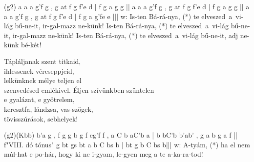 \documentclass[twoside]{article}
\begin{document}

\begin{aretino}
(g2) a a a g'f g , g at f g f'e d | f g a g g || a a a g'f g , g at f g f'e d | f g a g g || a a a g'f g , g at f g f'e d | f g a g'fe e |||
w: Is-ten Bá-rá-nya, (*) te elveszed~a~vi-lág bű-ne-it, ir-gal-mazz ne-künk! Is-ten Bá-rá-nya, (*) te elveszed~a~vi-lág bű-ne-it, ir-gal-mazz ne-künk! Is-ten Bá-rá-nya, (*) te elveszed~a~vi-lág bű-ne-it, adj ne-künk bé-két!
\end{aretino}



\begin{hymnstanzas}
  Tápláljanak szent titkaid,\\
  ihlessenek vércseppjeid,\\
  lelkünknek mélye teljen el\\
  szenvedésed emlékivel.
\stanzabreak
  Éljen szívünkben szüntelen\\
  e gyalázat, e gyötrelem,\\
  keresztfa, lándzsa, vas-szögek,\\
  tövisszúrások, sebhelyek!
\end{hymnstanzas}


\begin{aretino}
(g2)(Kbb) b'a g , f g g b g f eg'f f , a C b aC'b a | b bC'b b'ab' , g a b g a f || 
f"VIII. dó tónus" g bt gs bt a b C bs b | bt g b C bs b|||
w: A-tyám, (*) ha el nem múl-hat e po-hár, hogy ki ne i-gyam, le-gyen meg a te a-ka-ra-tod!
\end{aretino}
\end{document}
